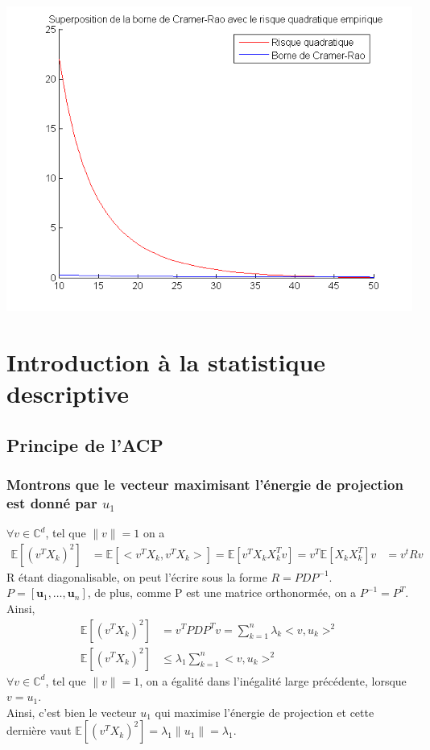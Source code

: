 \documentclass{report}
\begin{document}
\begin{center}
				\includegraphics[scale=0.7]{sources/Q314-3.png}
			\end{center}

\chapter{Introduction à la statistique descriptive}
	\section{Principe de l'ACP}
		\subsection{Montrons que le vecteur maximisant l'énergie de projection est donné par $u_1$}
			$\forall v \in \mathbb{C}^d$, tel que $\lVert v \rVert = 1$ on a
			\begin{align*}
				\mathbb{E}[(v^TX_k)^2] &= \mathbb{E}[<v^TX_k, v^TX_k>] = \mathbb{E}[v^TX_kX_k^Tv] = v^T\mathbb{E}[X_kX_k^T]v
				&= v^tRv 
			\end{align*}
			R étant diagonalisable, on peut l'écrire sous la forme $R=PDP^{-1}$.\\
			$P = [\textbf{u}_1, \ldots, \textbf{u}_n]$, de plus, comme P est une matrice orthonormée, on a $P^{-1} = P^T$.\\
			Ainsi, 
			\begin{align*}
				\mathbb{E}[(v^TX_k)^2] &= v^TPDP^Tv = \sum\limits_{k=1}^n \lambda_k<v, u_k>^2\\
				\mathbb{E}[(v^TX_k)^2] &\leq \lambda_1\sum\limits_{k=1}^n <v, u_k>^2
			\end{align*}
			$\forall v \in \mathbb{C}^d$, tel que $\lVert v \rVert = 1$, on a égalité dans l'inégalité large précédente, lorsque $v=u_1$. \\
			Ainsi, c'est bien le vecteur $u_1$ qui maximise l'énergie de projection et cette dernière vaut $\mathbb{E}[(v^TX_k)^2] = \lambda_1 \lVert u_1 \rVert = \lambda_1$.
\end{document}
